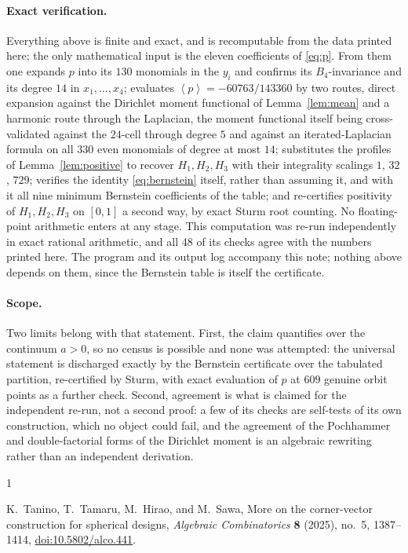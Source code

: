 \documentclass[11pt]{amsart}
\theoremstyle{remark}
\newcommand{\mean}[1]{\left\langle #1\right\rangle}
\begin{document}
\paragraph{Exact verification.}
Everything above is finite and exact, and is recomputable from the data
printed here; the only mathematical input is the eleven coefficients
of \eqref{eq:p}. From them one expands $p$ into its $130$ monomials in
the $y_i$ and confirms its $B_4$-invariance and its degree $14$ in
$x_1,\ldots,x_4$; evaluates $\mean{p}=-60763/143360$ by two routes,
direct expansion against the Dirichlet moment functional of
Lemma~\ref{lem:mean} and a harmonic route through the Laplacian, the
moment functional itself being cross-validated against the $24$-cell
through degree $5$ and against an iterated-Laplacian formula on all
$330$ even monomials of degree at most $14$; substitutes the profiles
of Lemma~\ref{lem:positive} to recover $H_1,H_2,H_3$ with their
integrality scalings $1$, $32$, $729$; verifies the identity
\eqref{eq:bernstein} itself, rather than assuming it, and with it all
nine minimum Bernstein coefficients of the table; and re-certifies
positivity of $H_1,H_2,H_3$ on $[0,1]$ a second way, by exact Sturm
root counting. No floating-point arithmetic enters at any stage. This
computation was re-run independently in exact rational arithmetic, and
all $48$ of its checks agree with the numbers printed here. The program
and its output log accompany this note; nothing above depends on them,
since the Bernstein table is itself the certificate.

\medskip

\paragraph{Scope.}
Two limits belong with that statement. First, the claim quantifies over
the continuum $a>0$, so no census is possible and none was attempted:
the universal statement is discharged exactly by the Bernstein
certificate over the tabulated partition, re-certified by Sturm, with
exact evaluation of $p$ at $609$ genuine orbit points as a further
check. Second, agreement is what is claimed for the independent re-run,
not a second proof: a few of its checks are self-tests of its own
construction, which no object could fail, and the agreement of the
Pochhammer and double-factorial forms of the Dirichlet moment is an
algebraic rewriting rather than an independent derivation.

\begin{thebibliography}{1}

K.~Tanino, T.~Tamaru, M.~Hirao, and M.~Sawa,
\newblock More on the corner-vector construction for spherical designs,
\newblock \emph{Algebraic Combinatorics} \textbf{8} (2025), no.~5,
1387--1414,
\newblock \href{https://doi.org/10.5802/alco.441}{doi:10.5802/alco.441}.

\end{thebibliography}
\end{document}
